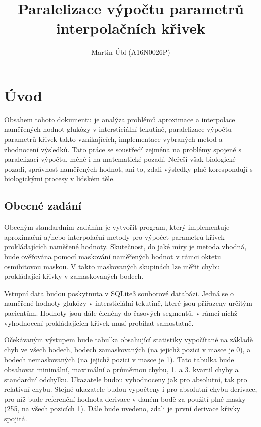 \documentclass[]{thesiskiv}
\author{Martin Úbl (A16N0026P)}
\title{Paralelizace výpočtu parametrů interpolačních křivek}
\begin{document}
\maketitle
\tableofcontents

\chapter{Úvod}

Obsahem tohoto dokumentu je analýza problémů aproximace a interpolace naměřených hodnot glukózy v intersticiální tekutině, paralelizace výpočtu parametrů křivek takto vznikajících, implementace vybraných metod a zhodnocení výsledků. Tato práce se soustředí zejména na problémy spojené s paralelizací výpočtu, méně i na matematické pozadí. Neřeší však biologické pozadí, správnost naměřených hodnot, ani to, zdali výsledky plně korespondují s biologickými procesy v lidském těle.

\section{Obecné zadání}

Obecným standardním zadáním je vytvořit program, který implementuje aproximační a/nebo interpolační metody pro výpočet parametrů křivek prokládajících naměřené hodnoty. Skutečnost, do jaké míry je metoda vhodná, bude ověřována pomocí maskování naměřených hodnot v rámci oktetu osmibitovou maskou. V takto maskovaných skupinách lze měřit chybu prokládající křivky v zamaskovaných bodech.

Vstupní data budou poskytnuta v SQLite3 souborové databázi. Jedná se o naměřené hodnoty glukózy v intersticiální tekutině, které jsou přiřazeny určitým pacientům. Hodnoty jsou dále členěny do časových segmentů, v rámci nichž vyhodnocení prokládajících křivek musí probíhat samostatně.

Očekávaným výstupem bude tabulka obsahující statistiky vypočítané na základě chyb ve všech bodech, bodech zamaskovaných (na jejichž pozici v masce je 0), a bodech nemaskovaných (na jejichž pozici v masce je 1). Tato tabulka bude obsahovat minimální, maximální a průměrnou chybu, 1. a 3. kvartil chyby a standardní odchylku. Ukazatele budou vyhodnoceny jak pro absolutní, tak pro relativní chybu. Stejné ukazatele budou vypočteny i pro absolutní chybu derivace, pro níž bude referenční hodnota derivace v daném bodě za použití plné masky (255, na všech pozicích 1). Dále bude uvedeno, zdali je první derivace křivky spojitá.
\end{document}
